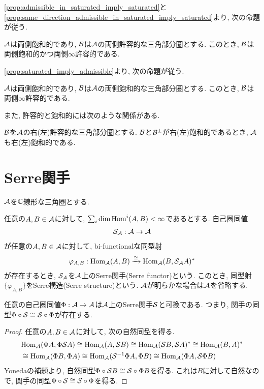 \documentclass[uplatex, a4paper, 14Q, dvipdfmx]{jsarticle}
\begin{document}
\cref{prop:admissible_in_saturated_imply_saturated}と\cref{prop:same_direction_admissible_in_saturated_imply_saturated}より, 次の命題が従う.

\begin{corollary}
  $\A$は両側飽和的であり, $\B$は$\A$の両側許容的な三角部分圏とする. 
  このとき, $\B$は両側飽和的かつ両側$\infty$許容的である. 
\end{corollary}

\cref{prop:saturated_imply_admissible}より, 次の命題が従う.

\begin{corollary}
  $\A$は両側飽和的であり, $\B$は$\A$の両側飽和的な三角部分圏とする. 
  このとき, $\B$は両側$\infty$許容的である. 
\end{corollary}

また, 許容的と飽和的には次のような関係がある. 

\begin{theorem}
  $\B$を$\A$の右(左)許容的な三角部分圏とする. 
  $\B$と$\Bperp$が右(左)飽和的であるとき, $\A$も右(左)飽和的である. 
\end{theorem}

\section{Serre関手}

$\A$を$\bbC$線形な三角圏とする. 

\begin{definition}[Serre関手]
  任意の$A,B \in \A$に対して, $\sum_{i} \dim \Hom^i(A,B) < \infty$であるとする. 
  自己圏同値
  \begin{align*}
    \S_\A : \A \to \A
  \end{align*}
  が任意の$A,B \in \A$に対して, bi-functionalな同型射
  \begin{align*}
    \varphi_{A,B} : \Hom_\A(A,B) \xrightarrow{\cong} \Hom_\A(B,\S_\A A)^\ast
  \end{align*}
  が存在するとき, $\S_\A$を$\A$上のSerre関手(Serre functor)という. 
  このとき, 同型射$\{\varphi_{A,B}\}$をSerre構造(Serre structure)という. 
  $\A$が明らかな場合は$\A$を省略する. 
\end{definition}

\begin{lemma}
  任意の自己圏同値$\Phi : \A \to \A$は$\A$上のSerre関手$\S$と可換である. 
  つまり, 関手の同型$\Phi \circ \S \cong \S \circ \Phi$が存在する. 
\end{lemma}

\begin{proof}
  任意の$A, B \in \A$に対して, 次の自然同型を得る.
  \begin{align*}
    &\Hom_\A(\Phi A,\Phi \S A)
    \cong \Hom_\A(A,\S B) 
    \cong \Hom_\A(\S B, \S A)^\ast
    \cong \Hom_\A(B,A)^\ast \\
    &\cong \Hom_\A(\Phi B, \Phi A)
    \cong \Hom_\A(\S^{-1} \Phi A, \Phi B)
    \cong \Hom_\A(\Phi A, \S \Phi B)
  \end{align*}
  Yonedaの補題より, 自然同型$\Phi \circ \S B \cong \S \circ \Phi B$を得る. 
  これは$B$に対して自然なので, 関手の同型$\Phi \circ \S \cong \S \circ \Phi$を得る. 
\end{proof}
\end{document}
